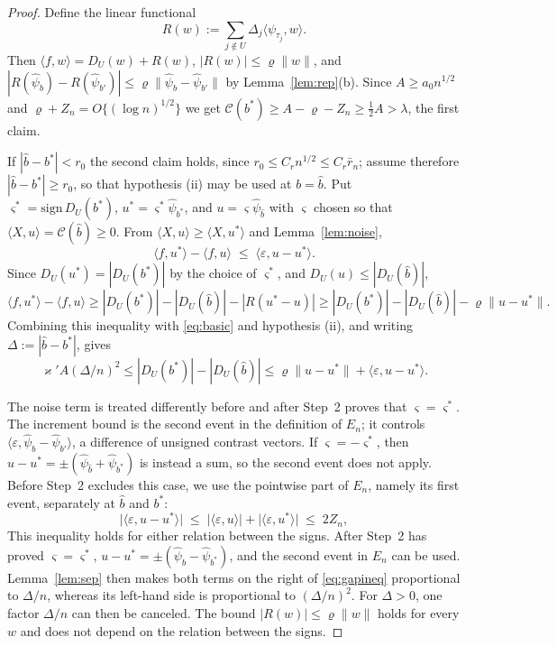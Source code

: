 \documentclass[10pt,a4paper]{amsart}
\begin{document}
\begin{proof}
Define the linear functional
\[
R(w):=\sum_{j\notin U}\Delta_j\langle\psi_{\tau_j},w\rangle.
\]
Then $\langle f,w\rangle=D_U(w)+R(w)$,
$|R(w)|\le\varrho\|w\|$, and
$|R(\hat\psi_b)-R(\hat\psi_{b'})|
\le\varrho\|\hat\psi_b-\hat\psi_{b'}\|$ by Lemma~\ref{lem:rep}(b). Since $A \ge a_0n^{1/2}$ and
$\varrho + Z_n = O\{(\log n)^{1/2}\}$ we get
$\mathcal{C}(b^*) \ge A - \varrho - Z_n \ge \tfrac12 A > \lambda$, the first
claim.

If $|\hat b - b^*| < r_0$ the second claim holds, since $r_0 \le C_r n^{1/2} \le C_r \bar r_n$; assume therefore $|\hat b - b^*| \ge r_0$, so that hypothesis (ii) may be used at $b = \hat b$. Put $\varsigma^* = \mathrm{sign}\, D_U(b^*)$, $u^* = \varsigma^*\hat\psi_{b^*}$,
and $u = \varsigma \hat\psi_{\hat b}$ with $\varsigma$ chosen so that
$\langle X,u\rangle = \mathcal{C}(\hat b) \ge 0$. From
$\langle X,u\rangle \ge \langle X,u^*\rangle$ and Lemma~\ref{lem:noise},
\begin{equation}
\label{eq:basic}
\langle f,u^*\rangle - \langle f,u\rangle \;\le\;
\langle \varepsilon, u - u^*\rangle .
\end{equation}
Since $D_U(u^*)=|D_U(b^*)|$ by the choice of $\varsigma^*$, and
$D_U(u)\le|D_U(\hat b)|$,
\[
\langle f,u^*\rangle-\langle f,u\rangle
\ge |D_U(b^*)|-|D_U(\hat b)|-|R(u^*-u)|
\ge |D_U(b^*)|-|D_U(\hat b)|-\varrho\|u-u^*\|.
\]
Combining this inequality with \eqref{eq:basic} and hypothesis (ii), and
writing $\Delta:=|\hat b-b^*|$, gives
\begin{equation}
\label{eq:gapineq}
\varkappa' A(\Delta/n)^2
\le |D_U(b^*)|-|D_U(\hat b)|
\le \varrho\|u-u^*\|+\langle\varepsilon,u-u^*\rangle.
\end{equation}

The noise term is treated differently before and after Step~2 proves that
$\varsigma=\varsigma^*$. The increment bound is the second event in the
definition of $E_n$; it controls
$\langle\varepsilon,\hat\psi_b-\hat\psi_{b'}\rangle$, a difference of
unsigned contrast vectors. If $\varsigma=-\varsigma^*$, then
$u-u^*=\pm(\hat\psi_{\hat b}+\hat\psi_{b^*})$ is instead a sum, so the second
event does not apply. Before Step~2 excludes this case, we use the pointwise
part of $E_n$, namely its first event, separately at $\hat b$ and $b^*$:
\[
\big| \langle\varepsilon, u-u^*\rangle \big| \;\le\; \big|\langle\varepsilon,u\rangle\big| + \big|\langle\varepsilon,u^*\rangle\big| \;\le\; 2Z_n ,
\]
This inequality holds for either relation between the signs. After Step~2 has
proved $\varsigma=\varsigma^*$,
$u-u^*=\pm(\hat\psi_{\hat b}-\hat\psi_{b^*})$, and the second event in $E_n$
can be used. Lemma~\ref{lem:sep} then makes both terms on the right of
\eqref{eq:gapineq} proportional to $\Delta/n$, whereas its left-hand side is
proportional to $(\Delta/n)^2$. For $\Delta>0$, one factor $\Delta/n$ can then
be canceled. The bound $|R(w)|\le\varrho\|w\|$ holds for every $w$ and does
not depend on the relation between the signs.


\end{proof}
\end{document}
